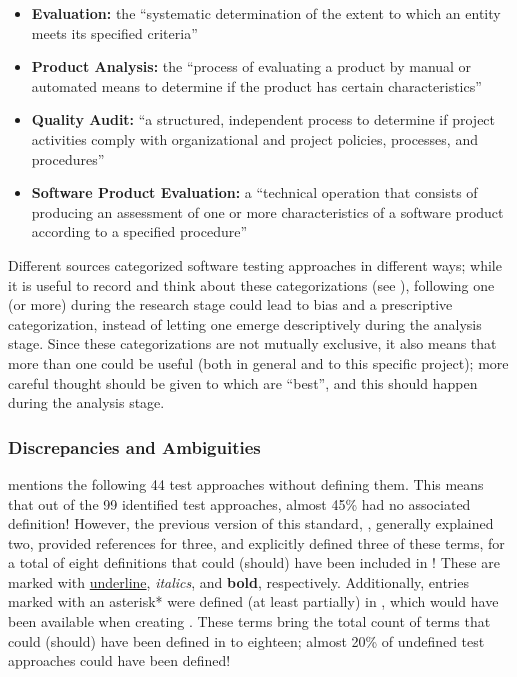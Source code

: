 \begin{itemize}
      \item \textbf{Evaluation:} the ``systematic determination of the extent
            to which an entity meets its specified criteria''
            \cite[p.~167]{IEEE2017}
      \item \textbf{Product Analysis:} the ``process of evaluating a product by
            manual or automated means to determine if the product has certain
            characteristics'' \cite[p.~343]{IEEE2017}
      \item \textbf{Quality Audit:} ``a structured, independent process to
            determine if project activities comply with organizational and
            project policies, processes, and procedures'' \cite[p.~361]{IEEE2017}
      \item \textbf{Software Product Evaluation:} a ``technical operation that
            consists of producing an assessment of one or more characteristics
            of a software product according to a specified procedure''
            \cite[p.~424]{IEEE2017}
\end{itemize}

Different sources categorized software testing approaches in different ways;
while it is useful to record and think about these categorizations (see
), following one (or more) during the research
stage could lead to bias and a prescriptive categorization, instead of letting
one emerge descriptively during the analysis stage. Since these categorizations
are not mutually exclusive, it also means that more than one could be useful
(both in general and to this specific project); more careful thought should be
given to which are ``best'', and this should happen during the analysis stage.

\subsubsection{Discrepancies and Ambiguities}

\citet{IEEE2022} mentions the following 44 test approaches without defining them.
This means that out of the 99 identified test approaches, almost 45\% had no
associated definition!
However, the previous version of this standard, \citep{IEEE2013}, generally
explained two, provided references for three, and explicitly defined three of
these terms, for a total of eight definitions that could (should) have been
included in \citep{IEEE2022}! These are marked with \underline{underline},
\emph{italics}, and \textbf{bold}, respectively. Additionally, entries marked
with an asterisk* were defined (at least partially) in \citep{IEEE2017}, which
would have been available when creating \citep{IEEE2022}. These terms bring the
total count of terms that could (should) have been defined in \citep{IEEE2022}
to eighteen; almost 20\% of undefined test approaches could have been defined!


